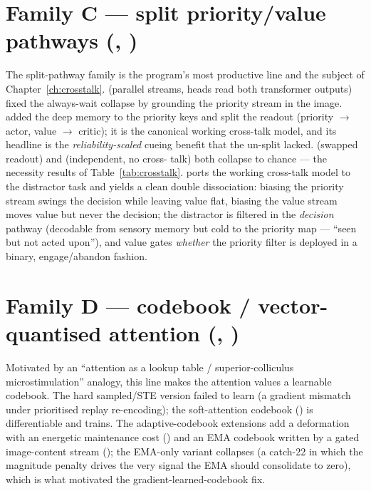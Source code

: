\section{Family C --- split priority/value pathways (, )}
The split-pathway family is the program's most productive line and the subject of
Chapter~\ref{ch:crosstalk}.  (parallel streams, heads read both transformer
outputs) fixed the always-wait collapse by grounding the priority stream in the image.
 added the deep memory to the priority keys and split the readout (priority
$\to$ actor, value $\to$ critic); it is the canonical working cross-talk model, and its
headline is the \emph{reliability-scaled} cueing benefit that the un-split 
lacked.  (swapped readout) and  (independent, no cross-
talk) both collapse to chance --- the necessity results of Table~\ref{tab:crosstalk}.
 ports the working cross-talk model to the distractor task and yields a
clean double dissociation: biasing the priority stream swings the decision while leaving
value flat, biasing the value stream moves value but never the decision; the distractor is
filtered in the \emph{decision} pathway (decodable from sensory memory but cold to the
priority map --- ``seen but not acted upon''), and value gates \emph{whether} the priority
filter is deployed in a binary, engage/abandon fashion.

\section{Family D --- codebook / vector-quantised attention (, )}
Motivated by an ``attention as a lookup table / superior-colliculus microstimulation''
analogy, this line makes the attention values a learnable codebook. The hard sampled/STE
version failed to learn (a gradient mismatch under prioritised replay re-encoding); the
soft-attention codebook () is differentiable and trains. The adaptive-codebook
extensions add a deformation with an energetic maintenance cost () and an
EMA codebook written by a gated image-content stream (); the EMA-only
variant collapses (a catch-22 in which the magnitude penalty drives the very signal the EMA
should consolidate to zero), which is what motivated the gradient-learned-codebook fix.

